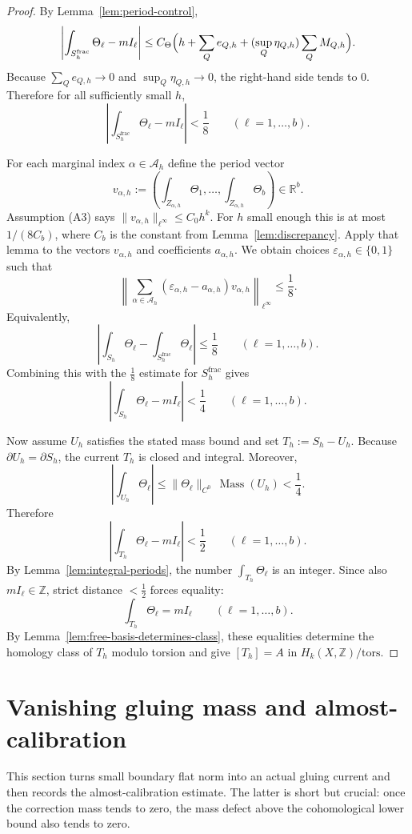 \documentclass[11pt]{article}
\numberwithin{equation}{section}
\theoremstyle{plain}
\theoremstyle{definition}
\theoremstyle{remark}
\DeclareMathOperator{\Mass}{Mass}
\newcommand{\R}{\mathbb{R}}
\newcommand{\Z}{\mathbb{Z}}
\newcommand{\calA}{\mathcal{A}}
\begin{document}
\begin{proof}
By Lemma~\ref{lem:period-control},
\[
\left|\int_{S_h^{\mathrm{frac}}}\Theta_\ell - mI_\ell\right|
\le
C_\Theta\Bigl(h+\sum_Q e_{Q,h} + (\sup_Q\eta_{Q,h})\sum_Q M_{Q,h}\Bigr).
\]
Because $\sum_Q e_{Q,h}\to 0$ and $\sup_Q\eta_{Q,h}\to 0$, the right-hand side tends to $0$.  Therefore for all sufficiently small $h$,
\[
\left|\int_{S_h^{\mathrm{frac}}}\Theta_\ell - mI_\ell\right|<\frac18
\qquad (\ell=1,\dots,b).
\]

For each marginal index $\alpha\in\calA_h$ define the period vector
\[
v_{\alpha,h}:=\left(\int_{Z_{\alpha,h}}\Theta_1,\dots,\int_{Z_{\alpha,h}}\Theta_b\right)\in\R^b.
\]
Assumption (A3) says $\|v_{\alpha,h}\|_{\ell^\infty}\le C_0 h^k$.  For $h$ small enough this is at most $1/(8C_b)$, where $C_b$ is the constant from Lemma~\ref{lem:discrepancy}.  Apply that lemma to the vectors $v_{\alpha,h}$ and coefficients $a_{\alpha,h}$.  We obtain choices $\varepsilon_{\alpha,h}\in\{0,1\}$ such that
\[
\left\|\sum_{\alpha\in\calA_h}(\varepsilon_{\alpha,h}-a_{\alpha,h})v_{\alpha,h}\right\|_{\ell^\infty}\le \frac18.
\]
Equivalently,
\[
\left|\int_{S_h}\Theta_\ell - \int_{S_h^{\mathrm{frac}}}\Theta_\ell\right|\le \frac18
\qquad (\ell=1,\dots,b).
\]
Combining this with the $\tfrac18$ estimate for $S_h^{\mathrm{frac}}$ gives
\[
\left|\int_{S_h}\Theta_\ell - mI_\ell\right|<\frac14
\qquad (\ell=1,\dots,b).
\]

Now assume $U_h$ satisfies the stated mass bound and set $T_h:=S_h-U_h$.  Because $\partial U_h=\partial S_h$, the current $T_h$ is closed and integral.  Moreover,
\[
\left|\int_{U_h}\Theta_\ell\right|
\le \|\Theta_\ell\|_{C^0}\,\Mass(U_h)
< \frac14.
\]
Therefore
\[
\left|\int_{T_h}\Theta_\ell - mI_\ell\right|<\frac12
\qquad (\ell=1,\dots,b).
\]
By Lemma~\ref{lem:integral-periods}, the number $\int_{T_h}\Theta_\ell$ is an integer.  Since also $mI_\ell\in\Z$, strict distance $<\tfrac12$ forces equality:
\[
\int_{T_h}\Theta_\ell = mI_\ell
\qquad (\ell=1,\dots,b).
\]
By Lemma~\ref{lem:free-basis-determines-class}, these equalities determine the homology class of $T_h$ modulo torsion and give $[T_h]=A$ in $H_k(X,\Z)/\mathrm{tors}$.
\end{proof}

\section{Vanishing gluing mass and almost-calibration}\label{sec:almost}

This section turns small boundary flat norm into an actual gluing current and then records the almost-calibration estimate.  The latter is short but crucial: once the correction mass tends to zero, the mass defect above the cohomological lower bound also tends to zero.
\end{document}
